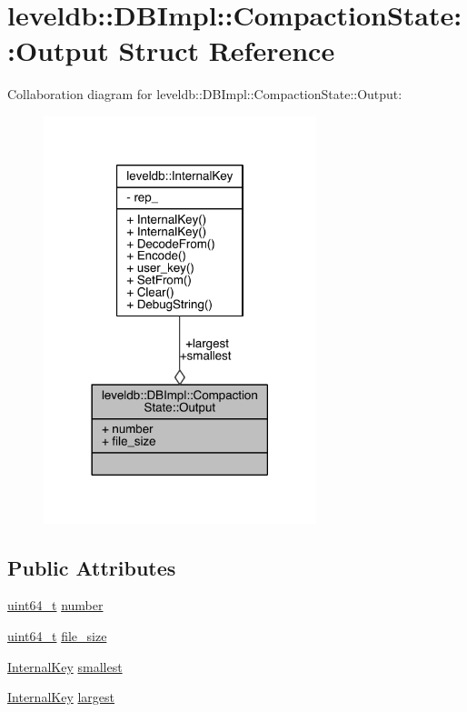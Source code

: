 \hypertarget{structleveldb_1_1_d_b_impl_1_1_compaction_state_1_1_output}{}\section{leveldb\+:\+:D\+B\+Impl\+:\+:Compaction\+State\+:\+:Output Struct Reference}
\label{structleveldb_1_1_d_b_impl_1_1_compaction_state_1_1_output}


Collaboration diagram for leveldb\+:\+:D\+B\+Impl\+:\+:Compaction\+State\+:\+:Output\+:\nopagebreak
\begin{figure}[H]
\begin{center}
\leavevmode
\includegraphics[width=225pt]{structleveldb_1_1_d_b_impl_1_1_compaction_state_1_1_output__coll__graph}
\end{center}
\end{figure}
\subsection*{Public Attributes}
\begin{DoxyCompactItemize}
\item 
\hyperlink{stdint_8h_aaa5d1cd013383c889537491c3cfd9aad}{uint64\+\_\+t} \hyperlink{structleveldb_1_1_d_b_impl_1_1_compaction_state_1_1_output_aa4b759dca2a83bdb8d9edbf7e2d213e2}{number}
\item 
\hyperlink{stdint_8h_aaa5d1cd013383c889537491c3cfd9aad}{uint64\+\_\+t} \hyperlink{structleveldb_1_1_d_b_impl_1_1_compaction_state_1_1_output_a37906cee65a9d1873b7b7a4169f22402}{file\+\_\+size}
\item 
\hyperlink{classleveldb_1_1_internal_key}{Internal\+Key} \hyperlink{structleveldb_1_1_d_b_impl_1_1_compaction_state_1_1_output_a88ada857d0cf32ae8e76d7baf4e80c69}{smallest}
\item 
\hyperlink{classleveldb_1_1_internal_key}{Internal\+Key} \hyperlink{structleveldb_1_1_d_b_impl_1_1_compaction_state_1_1_output_a6e257f231aba82d20cb7199a552b2a63}{largest}
\end{DoxyCompactItemize}



